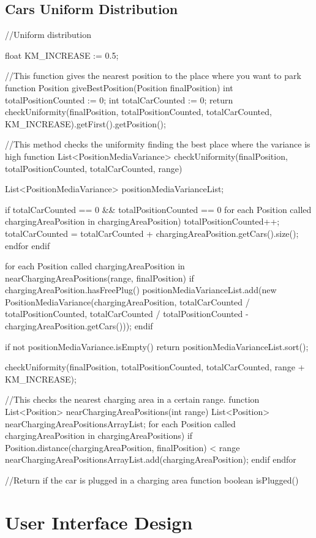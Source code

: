 \documentclass[11pt,a4paper]{report}
\begin{document}
\section{Cars Uniform Distribution}
\begin{pseudocodeEnv}
//Uniform distribution	

float KM_INCREASE := 0.5;
	
//This function gives the nearest position to the place where you want to park
function Position giveBestPosition(Position finalPosition){
	int totalPositionCounted := 0;
	int totalCarCounted := 0;
	return checkUniformity(finalPosition, totalPositionCounted, totalCarCounted, KM_INCREASE).getFirst().getPosition();
}
	
//This method checks the uniformity finding the best place where the variance is high
function List<PositionMediaVariance> checkUniformity(finalPosition, totalPositionCounted, totalCarCounted, range){
	List<PositionMediaVariance> positionMediaVarianceList;
	
	if totalCarCounted == 0 && totalPositionCounted == 0
		for each Position called chargingAreaPosition in chargingAreaPosition)
			totalPositionCounted++;
			totalCarCounted = totalCarCounted + chargingAreaPosition.getCars().size();
		endfor
	endif
	
	for each Position called chargingAreaPosition in nearChargingAreaPositions(range, finalPosition){
		if chargingAreaPosition.hasFreePlug()
			positionMediaVarianceList.add(new PositionMediaVariance(chargingAreaPosition, totalCarCounted / totalPositionCounted, totalCarCounted / totalPositionCounted - chargingAreaPosition.getCars()));
		endif
	}
		
	if not positionMediaVariance.isEmpty(){
		return positionMediaVarianceList.sort();
	}
	
	checkUniformity(finalPosition, totalPositionCounted, totalCarCounted, range + KM_INCREASE);
}

//This checks the nearest charging area in a certain range.
function List<Position> nearChargingAreaPositions(int range){
	List<Position> nearChargingAreaPositionsArrayList;
	for each Position called chargingAreaPosition in chargingAreaPositions)
		if Position.distance(chargingAreaPosition, finalPosition) < range
			nearChargingAreaPositionsArrayList.add(chargingAreaPosition);
		endif
	endfor
}

//Return if the car is plugged in a charging area
function boolean isPlugged()
\end{pseudocodeEnv}
\chapter{User Interface Design}
\end{document}
